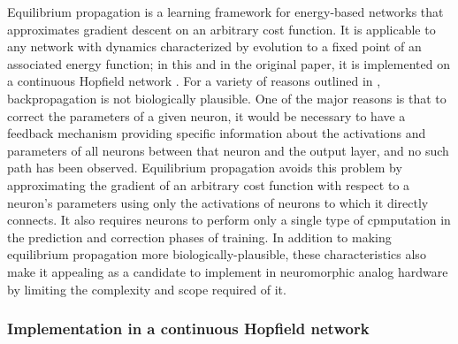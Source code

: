 \documentclass{article}
\begin{document}
Equilibrium propagation \cite{scellier17} is a learning framework for energy-based networks that approximates gradient descent on an arbitrary cost function. It is applicable to any network with dynamics characterized by evolution to a fixed point of an associated energy function; in this and in the original paper, it is implemented on a continuous Hopfield network \cite{hopfield1984}. For a variety of reasons outlined in \cite{bengio2015}, backpropagation is not biologically plausible. One of the major reasons is that to correct the parameters of a given neuron, it would be necessary to have a feedback mechanism providing specific information about the activations and parameters of all neurons between that neuron and the output layer, and no such path has been observed. Equilibrium propagation avoids this problem by approximating the gradient of an arbitrary cost function with respect to a neuron's parameters using only the activations of neurons to which it directly connects. It also requires neurons to perform only a single type of cpmputation in the prediction and correction phases of training. In addition to making equilibrium propagation more biologically-plausible, these characteristics also make it appealing as a candidate to implement in neuromorphic analog hardware by limiting the complexity and scope required of it.

\subsubsection{Implementation in a continuous Hopfield network}
\end{document}
